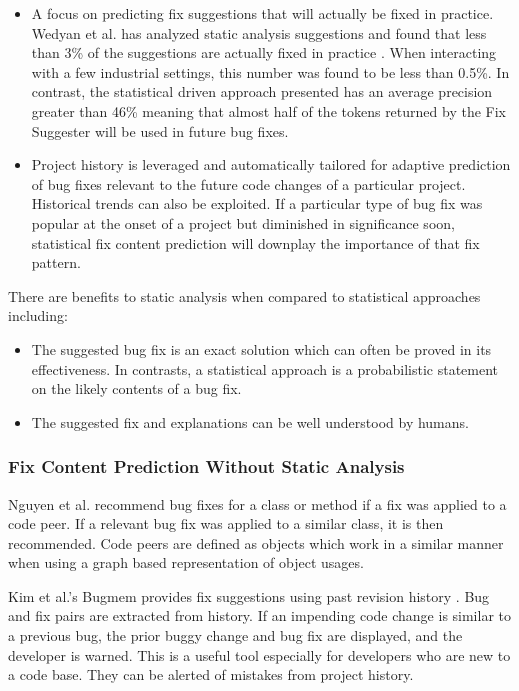 \documentclass[journal,10pt,draftclsnofoot,twocolumn]{IEEEtran}
\begin{document}
\begin{itemize}
\item A focus on predicting fix suggestions that will actually be fixed in practice. Wedyan et al.
has analyzed static analysis suggestions and found that less than
3\% of the suggestions are actually fixed in practice \cite{wedyan2009effectiveness}. When interacting
with a few industrial settings, this number was found to be less than
0.5\%. In contrast, the statistical driven approach presented has an average precision greater than 46\% meaning that almost half of the tokens returned by the Fix Suggester will be used in future bug fixes.  
\item Project history is leveraged and automatically tailored for adaptive
prediction of bug fixes relevant to the future code changes of a particular
project. Historical trends can also be exploited. If a particular
type of bug fix was popular at the onset of a project but diminished
in significance soon, statistical fix content prediction will downplay
the importance of that fix pattern.
\end{itemize}

There are benefits to static analysis when compared to statistical
approaches including:

\begin{itemize}

\item The suggested bug fix is an exact solution which can often be proved
in its effectiveness. In contrasts, a statistical approach is a probabilistic
statement on the likely contents of a bug fix.

\item The suggested fix and explanations can be well understood by humans.

\end{itemize}

\subsubsection{Fix Content Prediction Without Static Analysis}
Nguyen et al. \cite{nguyen2010recurring} recommend bug fixes for a class or method if a fix was applied to a code peer. If a relevant bug fix was applied to a similar class, it is then recommended. Code peers are defined as objects which work in a similar manner when using a graph based representation of object usages.

Kim et al.'s Bugmem provides fix suggestions using past revision history \cite{Kim2006} . Bug and fix pairs are extracted from history. If an impending code change is similar to a previous bug, the prior buggy change and bug fix are displayed, and the developer is warned. This is a useful tool especially for developers who are new to a code base. They can be alerted of mistakes from project history. 
\end{document}
